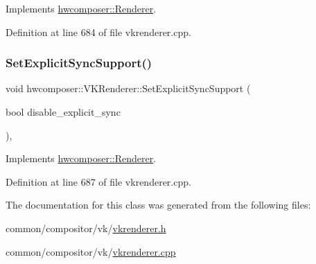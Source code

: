 Implements \mbox{\hyperlink{classhwcomposer_1_1Renderer_a0b7be67ed8f89c994cf3bcfd418ef0a4}{hwcomposer\+::\+Renderer}}.



Definition at line 684 of file vkrenderer.\+cpp.


\begin{DoxyCode}{0}
\end{DoxyCode}
\mbox{\label{classhwcomposer_1_1VKRenderer_ad0a97c5d88ce71c265a6bd5ee139ffe7}} 
\subsubsection{\texorpdfstring{Set\+Explicit\+Sync\+Support()}{SetExplicitSyncSupport()}}
{\footnotesize\ttfamily void hwcomposer\+::\+V\+K\+Renderer\+::\+Set\+Explicit\+Sync\+Support (\begin{DoxyParamCaption}\item[{bool}]{disable\+\_\+explicit\+\_\+sync }\end{DoxyParamCaption})\hspace{0.3cm}{\ttfamily [override]}, {\ttfamily [virtual]}}



Implements \mbox{\hyperlink{classhwcomposer_1_1Renderer_a8f889bf7b26aa7d1436e9ecf6d15e629}{hwcomposer\+::\+Renderer}}.



Definition at line 687 of file vkrenderer.\+cpp.


\begin{DoxyCode}{0}
\end{DoxyCode}


The documentation for this class was generated from the following files\+:\begin{DoxyCompactItemize}
\item 
common/compositor/vk/\mbox{\hyperlink{vkrenderer_8h}{vkrenderer.\+h}}\item 
common/compositor/vk/\mbox{\hyperlink{vkrenderer_8cpp}{vkrenderer.\+cpp}}\end{DoxyCompactItemize}
